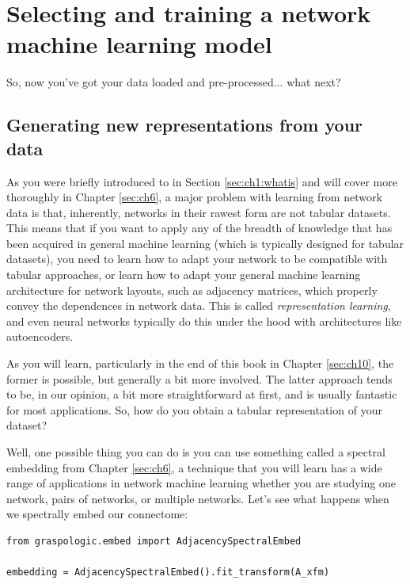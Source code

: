 \section{Selecting and training a network machine learning model}
\label{sec:ch2:select}

So, now you've got your data loaded and pre-processed... what next?

\subsection{Generating new representations from your data}

As you were briefly introduced to in Section \ref{sec:ch1:whatis} and will cover more thoroughly in Chapter \ref{sec:ch6}, a major problem with learning from network data is that, inherently, networks in their rawest form are not tabular datasets. This means that if you want to apply any of the breadth of knowledge that has been acquired in general machine learning (which is typically designed for tabular datasets), you need to learn how to adapt your network to be compatible with tabular approaches, or learn how to adapt your general machine learning architecture for network layouts, such as adjacency matrices, which properly convey the dependences in network data. This is called \emph{representation learning}, and even neural networks typically do this under the hood with architectures like autoencoders.

As you will learn, particularly in the end of this book in Chapter \ref{sec:ch10}, the former is possible, but generally a bit more involved. The latter approach tends to be, in our opinion, a bit more straightforward at first, and is usually fantastic for most applications. So, how do you obtain a tabular representation of your dataset? 

Well, one possible thing you can do is you can use something called a spectral embedding from Chapter \ref{sec:ch6}, a technique that you will learn has a wide range of applications in network machine learning whether you are studying one network, pairs of networks, or multiple networks. Let's see what happens when we spectrally embed our connectome:

\begin{lstlisting}[style=python]
from graspologic.embed import AdjacencySpectralEmbed

embedding = AdjacencySpectralEmbed().fit_transform(A_xfm)
\end{lstlisting}

